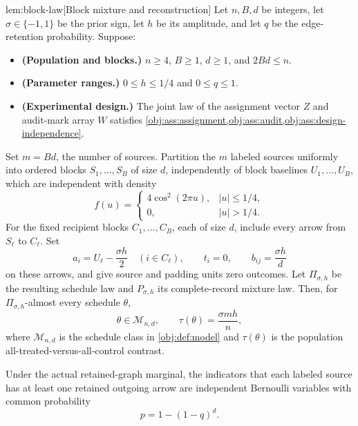 \begin{lemmav}{lem:block-law}[Block mixture and reconstruction]
Let \(n,B,d\) be integers, let \(\sigma\in\{-1,1\}\) be the prior sign, let \(h\) be its amplitude, and let \(q\) be the edge-retention probability. Suppose:
\begin{itemize}
\item \textbf{(Population and blocks.)} \(n\ge4\), \(B\ge1\), \(d\ge1\), and \(2Bd\le n\).
\item \textbf{(Parameter ranges.)} \(0\le h\le1/4\) and \(0\le q\le1\).
\item \textbf{(Experimental design.)} The joint law of the assignment vector \(Z\) and audit-mark array \(W\) satisfies \cref{obj:ass:assignment,obj:ass:audit,obj:ass:design-independence}.
\end{itemize}

Set \(m=Bd\), the number of sources. Partition the \(m\) labeled sources uniformly into ordered blocks \(S_1,\ldots,S_B\) of size \(d\), independently of block baselines \(U_1,\ldots,U_B\), which are independent with density
\[
f(u)=
\begin{cases}
4\cos^2(2\pi u),& |u|\le1/4,\\
0,& |u|>1/4.
\end{cases}
\]
For the fixed recipient blocks \(C_1,\ldots,C_B\), each of size \(d\), include every arrow from \(S_\ell\) to \(C_\ell\). Set
\[
a_i=U_\ell-\frac{\sigma h}{2}\quad(i\in C_\ell),
\qquad t_i=0,
\qquad b_{ij}=\frac{\sigma h}{d}
\]
on these arrows, and give source and padding units zero outcomes. Let \(\Pi_{\sigma,h}\) be the resulting schedule law and \(P_{\sigma,h}\) its complete-record mixture law. Then, for \(\Pi_{\sigma,h}\)-almost every schedule \(\theta\),
\[
\theta\in\mathcal M_{n,d},
\qquad
\tau(\theta)=\frac{\sigma mh}{n},
\]
where \(\mathcal M_{n,d}\) is the schedule class in \cref{obj:def:model} and \(\tau(\theta)\) is the population all-treated-versus-all-control contrast.

Under the actual retained-graph marginal, the indicators that each labeled source has at least one retained outgoing arrow are independent Bernoulli variables with common probability
\[
p=1-(1-q)^d.
\]


\end{lemmav}
